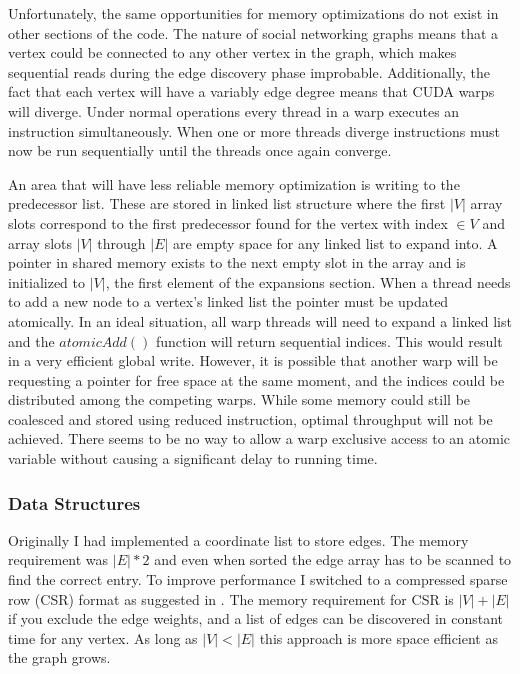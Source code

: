 \documentclass[10pt,twocolumn]{article}
\begin{document}
Unfortunately, the same opportunities for memory optimizations do not exist in other sections of the code. The nature of social networking graphs means that a vertex could be connected to any other vertex in the graph, which makes sequential reads during the edge discovery phase improbable. Additionally, the fact that each vertex will have a variably edge degree means that CUDA warps will diverge. Under normal operations every thread in a warp executes an instruction simultaneously. When one or more threads diverge instructions must now be run sequentially until the threads once again converge.
 
An area that will have less reliable memory optimization is writing to the predecessor list. These are stored in linked list structure where the first $|V|$ array slots correspond to the first predecessor found for the vertex with index $ \in V$ and array slots $|V|$ through $|E|$ are empty space for any linked list to expand into. A pointer in shared memory exists to the next empty slot in the array and is initialized to $|V|$, the first element of the expansions section. When a thread needs to add a new node to a vertex's linked list the pointer must be updated atomically. In an ideal situation, all warp threads will need to expand a linked list and the $atomicAdd()$ function will return sequential indices. This would result in a very efficient global write. However, it is possible that another warp will be requesting a pointer for free space at the same moment, and the indices could be distributed among the competing warps. While some memory could still be coalesced and stored using reduced instruction, optimal throughput will not be achieved. There seems to be no way to allow a warp exclusive access to an atomic variable without causing a significant delay to running time.

\subsubsection{Data Structures}
Originally I had implemented a coordinate list to store edges. The memory requirement was $|E| * 2$ and even when sorted the edge array has to be scanned to find the correct entry. To improve performance I switched to a compressed sparse row (CSR) format as suggested in \cite{Sariyuce}. The memory requirement for CSR is $|V| + |E|$ if you exclude the edge weights, and a list of edges can be discovered in constant time for any vertex. As long as $|V| < |E|$ this approach is more space efficient as the graph grows.
\end{document}
